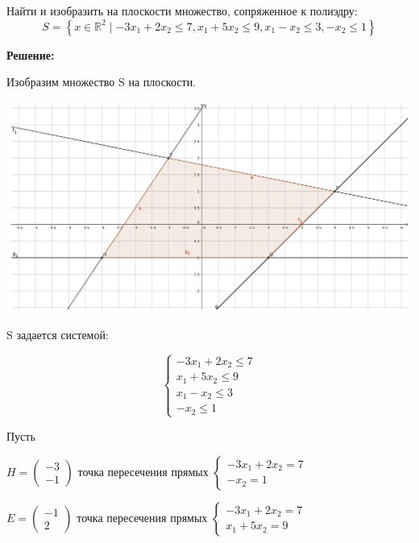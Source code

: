 \documentclass[a4paper,12pt]{article}
\newcommand{\lt}{\left}
\newcommand{\rt}{\right}
\begin{document}
	\vspace{\baselineskip}
	
	\section{}
	
	Найти и изобразить на плоскости множество, сопряженное к полиэдру: $$S = \left\{ x \in \mathbb{R}^2 \mid -3x_1 + 2x_2 \le 7, x_1 + 5x_2 \le 9, x_1 - x_2 \le 3, -x_2 \le 1\right\}$$
	
	\vspace{\baselineskip}
	
	\textbf{Решение:}
	
	\vspace{\baselineskip}
	
	Изобразим множество S на плоскости.
	
	\includegraphics[width=\textwidth]{image_problem2.pdf}
	
	S задается системой: 
	
	\[
	\left\{
	\begin{aligned}
	-3x_1 + 2x_2 \le 7  \\
	 x_1 + 5x_2 \le 9\\
	x_1 - x_2 \le 3\\
	-x_2 \le 1 
	\end{aligned}
	\right.
	\]
	
	Пусть 
	
	$H = \begin{pmatrix}
	-3\\
	-1
	\end{pmatrix}$ точка пересечения прямых
	$
	\lt\{\begin{aligned}
		-3x_1 + 2x_2 = 7  \\
		-x_2 = 1 
	\end{aligned}
	\rt.
	$
	
	$E = \begin{pmatrix}
	-1\\
	2
	\end{pmatrix}$ точка пересечения прямых
	$
	\lt\{\begin{aligned}
	-3x_1 + 2x_2 = 7  \\
	x_1 + 5x_2 = 9
	\end{aligned}
	\rt.
	$
	
\end{document}
